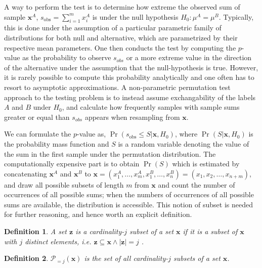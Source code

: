 \documentclass[a4paper]{article}
\newtheorem{mydef}{Definition}
\begin{document}
A way to perform the test is to determine how extreme the observed sum of sample $\bm{x}^A$, $s_{\text{obs}} = \sum_{i=1}^m x^A_i$ is under the null hypothesis $H_0: \mu^A = \mu^B$. Typically, this is done under the assumption of a particular parametric family of distributions for both null and alternative, which are parametrized by their respective mean parameters. One then conducts the test by computing the $p$-value
as the probability to observe $s_{obs}$ or a more extreme value in the direction of the alternative under the assumption that the null-hypothesis is true. However, it is rarely possible to compute this probability analytically and one often has to resort to asymptotic approximations. A non-parametric permutation test approach to the testing problem is to instead assume exchangability of the labels $A$ and $B$ under $H_0$, and calculate how frequently samples with sample sums greater or equal than $s_{obs}$ appears when resampling from $\bm{x}$. 

We can formulate the $p$-value as, $\Pr(s_{\text{obs}} \leq S | \bm{x},H_0)$, where $\Pr(S| \bm{x},H_0)$ is the probability mass function and $S$ is a random variable denoting the value of the sum in the first sample under the permutation distribution. The computationally expensive part is to obtain $\Pr(S)$ which is estimated by concatenating $\bm{x}^A$ and $\bm{x}^B$ to $\bm{x}=(x^A_{1},\ldots,x^A_{m},x^B_{1},\ldots,x^B_{n})=(x_1, x_2, \ldots, x_{n+m})$, and draw all possible subsets of length $m$ from $\bm{x}$ and count the number of occurrences of all possible sums; when the numbers of occurrences of all possible sums are available, the distribution is accessible. This notion of subset is needed for further reasoning, and hence worth an explicit definition.

\begin{mydef} A set $\bm{z}$ is a cardinality-$j$ subset of a set $\bm{x}$ if it is a subset of $\bm{x}$ with $j$ distinct elements, i.e. $\bm{z} \subseteq \bm{x} \land |\bm{z}|=j$ .\end{mydef}

\begin{mydef} $\mathcal{P}_{=j}(\bm{x})$ is the set of all cardinality-$j$ subsets of a set $\bm{x}$.\end{mydef}
\end{document}
